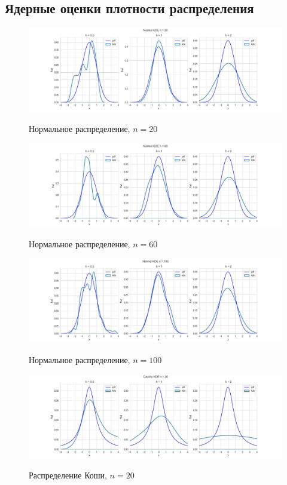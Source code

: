 \subsection{Ядерные оценки плотности распределения}
\begin{figure}[H]
	{\includegraphics[scale=0.45]{task_4/resource/Normal KDE20.jpg}}
		\caption{Нормальное распределение, $n=20$} 
		\label{fig:normal}
	\end{figure}
	
\begin{figure}[H]
	{\includegraphics[scale=0.45]{task_4/resource/Normal KDE60.jpg}}
		\caption{Нормальное распределение, $n=60$} 
		\label{fig:normal}
	\end{figure}
		
\begin{figure}[H]
	{\includegraphics[scale=0.45]{task_4/resource/Normal KDE100.jpg}}
		\caption{Нормальное распределение, $n=100$} 
		\label{fig:normal}
	\end{figure}

\begin{figure}[H]
	{\includegraphics[scale=0.45]{task_4/resource/Cauchy KDE20.jpg}}
		\caption{Распределение Коши, $n=20$} 
		\label{fig:normal}
	\end{figure}
	
